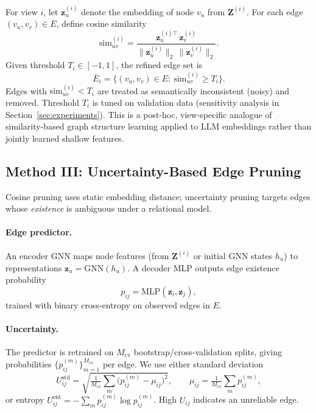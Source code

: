 \documentclass{article}
\begin{document}
For view $i$, let $\mathbf{z}^{(i)}_u$ denote the embedding of node $v_u$ from
$\mathbf{Z}^{(i)}$. For each edge $(v_u,v_v)\in E$, define cosine similarity
\begin{equation}
\mathrm{sim}^{(i)}_{uv}=
\frac{\mathbf{z}^{(i)\top}_u\,\mathbf{z}^{(i)}_v}
{\|\mathbf{z}^{(i)}_u\|_2\,\|\mathbf{z}^{(i)}_v\|_2}.
\label{eq:cosine_similarity}
\end{equation}
Given threshold $T_i\in[-1,1]$, the refined edge set is
\begin{equation}
\bar{E}_i=\{(v_u,v_v)\in E:\ \mathrm{sim}^{(i)}_{uv}\ge T_i\}.
\label{eq:cosine_prune}
\end{equation}
Edges with $\mathrm{sim}^{(i)}_{uv}<T_i$ are treated as semantically inconsistent
(noisy) and removed. Threshold $T_i$ is tuned on validation data (sensitivity analysis
in Section~\ref{sec:experiments}). This is a post-hoc, view-specific analogue of
similarity-based graph structure learning \citep{chen2020idgl} applied to LLM
embeddings rather than jointly learned shallow features.


\subsection{Method III: Uncertainty-Based Edge Pruning}
\label{sec:uncertainty-enhancer}

Cosine pruning uses static embedding distance; uncertainty pruning targets edges
whose \emph{existence} is ambiguous under a relational model.

\paragraph{Edge predictor.}
An encoder GNN maps node features (from $\mathbf{Z}^{(i)}$ or initial GNN states
$h_u$) to representations $\mathbf{z}_u=\mathrm{GNN}(h_u)$. A decoder MLP outputs
edge existence probability
\begin{equation}
p_{ij}=\mathrm{MLP}(\mathbf{z}_i,\mathbf{z}_j),
\label{eq:edge_probability}
\end{equation}
trained with binary cross-entropy on observed edges in $E$.

\paragraph{Uncertainty.}
The predictor is retrained on $M_{\mathrm{cv}}$ bootstrap/cross-validation splits,
giving probabilities $\{p_{ij}^{(m)}\}_{m=1}^{M_{\mathrm{cv}}}$ per edge. We use
either standard deviation
\begin{equation}
U_{ij}^{\mathrm{std}}=
\sqrt{\tfrac{1}{M_{\mathrm{cv}}}\textstyle\sum_m\big(p_{ij}^{(m)}-\mu_{ij}\big)^2},
\qquad
\mu_{ij}=\tfrac{1}{M_{\mathrm{cv}}}\textstyle\sum_m p_{ij}^{(m)},
\label{eq:std_uncertainty}
\end{equation}
or entropy $U_{ij}^{\mathrm{ent}}=-\sum_m p_{ij}^{(m)}\log p_{ij}^{(m)}$.
High $U_{ij}$ indicates an unreliable edge.
\end{document}
